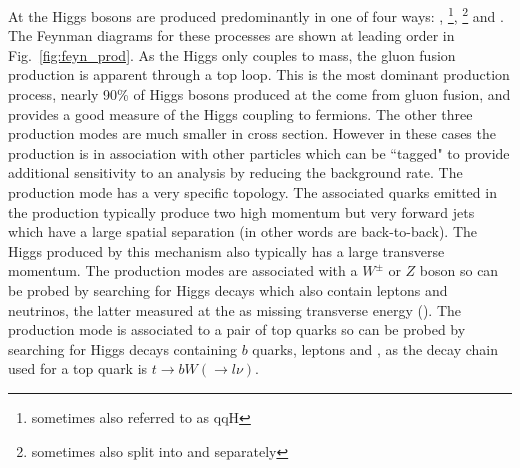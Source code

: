 At the \LHC \SM Higgs bosons are produced predominantly in one of four ways: \ggH, \VBF\footnote{sometimes also referred to as qqH}, \VH\footnote{sometimes also split into \WH and \ZH separately} and \ttH. The Feynman diagrams for these processes are shown at leading order in Fig.~\ref{fig:feyn_prod}. As the Higgs only couples to mass, the gluon fusion production is apparent through a top loop. This is the most dominant production process, nearly 90\% of Higgs bosons produced at the \LHC come from gluon fusion, and provides a good measure of the Higgs coupling to fermions. The other three production modes are much smaller in cross section. However in these cases the production is in association with other particles which can be ``tagged" to provide additional sensitivity to an analysis by reducing the background rate. The \VBF production mode has a very specific topology. The associated quarks emitted in the production typically produce two high momentum but very forward jets which have a large spatial separation (in other words are back-to-back). The Higgs produced by this mechanism also typically has a large transverse momentum. The \VH production modes are associated with a $W^{\pm}$ or $Z$ boson so can be probed by searching for Higgs decays which also contain leptons and neutrinos, the latter measured at the \LHC as missing transverse energy (\MET). The \ttH production mode is associated to a pair of top quarks so can be probed by searching for Higgs decays containing $b$ quarks, leptons and \MET, as the decay chain used for a top quark is $t\rightarrow bW(\rightarrow l\nu)$.

